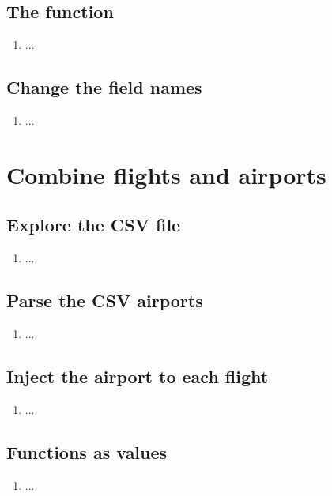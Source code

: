 \subsection{The  function}
\begin{enumerate}[resume*]
\item ...
\end{enumerate}

\subsection{Change the field names}
\begin{enumerate}[resume*]
\item ...
\end{enumerate}

\section{Combine flights and airports}

\subsection{Explore the CSV file}
\begin{enumerate}
\item ...
\end{enumerate}

\subsection{Parse the CSV airports}
\begin{enumerate}[resume*]
\item ...
\end{enumerate}

\subsection{Inject the airport to each flight}
\begin{enumerate}[resume*]
\item ...
\end{enumerate}

\subsection{Functions as values}
\begin{enumerate}[resume*]
\item ...
\end{enumerate}

